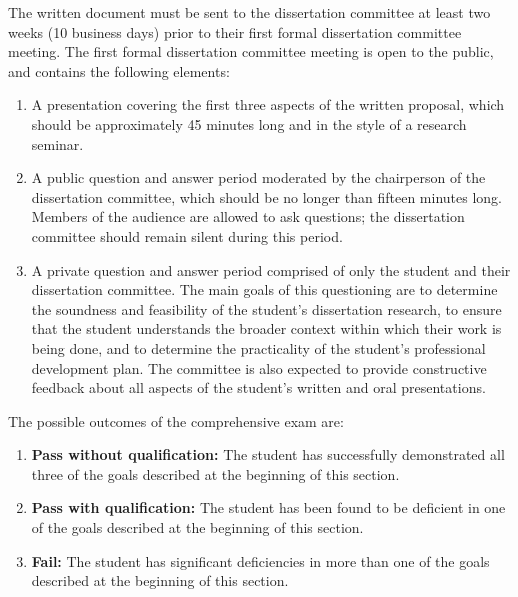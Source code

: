 The written document must be sent to the dissertation committee at least two
weeks (10 business days) prior to their first formal dissertation committee
meeting.  The first formal dissertation committee meeting is open to the public,
and contains the following elements:

\begin{enumerate}
\item  A presentation covering the first three aspects of the written
  proposal, which should be approximately 45 minutes long and in the
  style of a research seminar.

\item  A public question and answer period moderated by the
  chairperson of the dissertation committee, which should be no longer than
  fifteen minutes long.  Members of the audience are allowed to ask
  questions; the dissertation committee should remain silent during this
  period.

\item  A private question and answer period comprised of only the
  student and their dissertation committee.  The main goals of this
  questioning are to determine the soundness and feasibility of the
  student's dissertation research, to ensure that the student
  understands the broader context within which their work is being
  done, and to determine the practicality of the student's
  professional development plan.  The committee is also expected to
  provide constructive feedback about all aspects of the student's
  written and oral presentations.

\end{enumerate}

\vspace{2mm}

\noindent
The possible outcomes of the comprehensive exam are:

\begin{enumerate}
\item  \textbf{Pass without qualification:} The student has
  successfully demonstrated all three of the goals described at the
  beginning of this section.

\item  \textbf{Pass with qualification:} The student has been found to
  be deficient in one of the goals described at the beginning of this
  section.

\item  \textbf{Fail:} The student has significant deficiencies in more
  than one of the goals described at the beginning of this section.

\end{enumerate}

